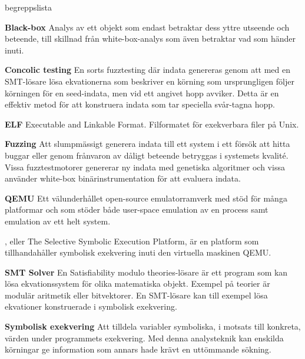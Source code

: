 \begin{labeling}{begreppslista}

  \item [\textbf{Black-box}] Analys av ett objekt som endast betraktar dess
      yttre utseende och beteende, till skillnad från white-box-analys som även
      betraktar vad som händer inuti.

  \item [\textbf{Concolic testing}] En sorts fuzztesting där indata genereras
      genom att med en SMT-lösare lösa ekvationerna som beskriver en körning som
      ursprungligen följer körningen för en seed-indata, men vid ett angivet
      hopp avviker. Detta är en effektiv metod för att konstruera indata som tar
      speciella svår-tagna hopp.

  \item [\textbf{ELF}] Executable and Linkable Format. Filformatet för
      exekverbara filer på Unix.

  \item [\textbf{Fuzzing}] Att slumpmässigt generera indata till ett system i
      ett försök att hitta buggar eller genom frånvaron av dåligt beteende
      betryggas i systemets kvalité. Vissa fuzztestmotorer genererar ny indata
      med genetiska algoritmer och vissa använder white-box binärinstrumentation
      för att evaluera indata.

  \item [\textbf{QEMU}] Ett välunderhållet open-source emulatorramverk med stöd
    för många platformar och som stöder både user-space emulation av en process
    samt emulation av ett helt system.

  \item [\textbf{\stoe}] \stoe, eller The Selective Symbolic Execution Platform, är
      en platform som tillhandahåller symbolisk exekvering inuti den virtuella
      maskinen QEMU.

  \item [\textbf{SMT Solver}] En Satisfiability modulo theories-lösare är ett
      program som kan lösa ekvationssystem för olika matematiska objekt. Exempel
      på teorier är modulär aritmetik eller bitvektorer. En SMT-lösare kan till
      exempel lösa ekvationer konstruerade i symbolisk exekvering.

  \item [\textbf{Symbolisk exekvering}] Att tilldela variabler symboliska, i
      motsats till konkreta, värden under programmets exekvering. Med denna
      analysteknik kan enskilda körningar ge information som annars hade krävt
      en uttömmande sökning.

\end{labeling}
